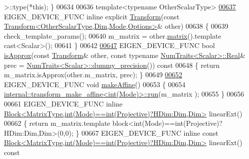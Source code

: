 \begin{DoxyCode}
       >::type(*\textcolor{keyword}{this}); \}
00634 
00636   \textcolor{keyword}{template}<\textcolor{keyword}{typename} OtherScalarType>
\hyperlink{group___geometry___module_a2a6f70385c79d72564e9b309f636ce1d}{00637}   EIGEN\_DEVICE\_FUNC \textcolor{keyword}{inline} \textcolor{keyword}{explicit} \hyperlink{group___geometry___module_a2a6f70385c79d72564e9b309f636ce1d}{Transform}(\textcolor{keyword}{const} 
      \hyperlink{group___geometry___module_class_eigen_1_1_transform}{Transform<OtherScalarType,Dim,Mode,Options>}& other)
00638   \{
00639     check\_template\_params();
00640     m\_matrix = other.\hyperlink{group___geometry___module_aec8168000a88a807130d41020af98d47}{matrix}().template cast<Scalar>();
00641   \}
00642 
\hyperlink{group___geometry___module_aa8aabb371eb391a0d1fa0134b34ae376}{00647}   EIGEN\_DEVICE\_FUNC \textcolor{keywordtype}{bool} \hyperlink{group___geometry___module_aa8aabb371eb391a0d1fa0134b34ae376}{isApprox}(\textcolor{keyword}{const} \hyperlink{group___geometry___module_class_eigen_1_1_transform}{Transform}& other, \textcolor{keyword}{const} \textcolor{keyword}{typename} 
      \hyperlink{group___core___module_struct_eigen_1_1_num_traits}{NumTraits<Scalar>::Real}& prec = 
      \hyperlink{group___core___module_struct_eigen_1_1_num_traits}{NumTraits<Scalar>::dummy\_precision}())\textcolor{keyword}{ const}
00648 \textcolor{keyword}{  }\{ \textcolor{keywordflow}{return} m\_matrix.isApprox(other.m\_matrix, prec); \}
00649 
\hyperlink{group___geometry___module_a18580c6c151bac89f03818164dd19632}{00652}   EIGEN\_DEVICE\_FUNC \textcolor{keywordtype}{void} \hyperlink{group___geometry___module_a18580c6c151bac89f03818164dd19632}{makeAffine}()
00653   \{
00654     \hyperlink{struct_eigen_1_1internal_1_1transform__make__affine}{internal::transform\_make\_affine<int(Mode)>::run}(m\_matrix
      );
00655   \}
00656 
00661   EIGEN\_DEVICE\_FUNC \textcolor{keyword}{inline} 
      \hyperlink{group___core___module_class_eigen_1_1_block}{Block<MatrixType,int(Mode)==int(Projective)?HDim:Dim,Dim>}
       linearExt()
00662   \{ \textcolor{keywordflow}{return} m\_matrix.template block<int(Mode)==int(Projective)?HDim:Dim,Dim>(0,0); \}
00667   EIGEN\_DEVICE\_FUNC \textcolor{keyword}{inline} \textcolor{keyword}{const} 
      \hyperlink{group___core___module_class_eigen_1_1_block}{Block<MatrixType,int(Mode)==int(Projective)?HDim:Dim,Dim>}
       linearExt()\textcolor{keyword}{ const}

\end{DoxyCode}
